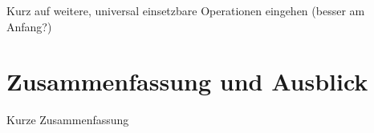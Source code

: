 \documentclass{llncs}
\begin{document}
	Kurz auf weitere, universal einsetzbare Operationen eingehen (besser am Anfang?)

\section{Zusammenfassung und Ausblick}
\label{sec:Zusammenfassung}

	Kurze Zusammenfassung

 






\newpage

\end{document}
